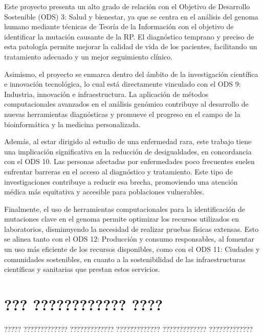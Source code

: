 \documentclass[11pt,spanish,listoffigures,listoftables]{tfgetsinf}
\begin{document}
Este proyecto presenta un alto grado de relación con el Objetivo de Desarrollo Sostenible (ODS) 3: Salud y bienestar, ya que se centra en el análisis del genoma humano mediante técnicas de Teoría de la Información con el objetivo de identificar la mutación causante de la RP. El diagnóstico temprano y preciso de esta patología permite mejorar la calidad de vida de los pacientes, facilitando un tratamiento adecuado y un mejor seguimiento clínico.

Asimismo, el proyecto se enmarca dentro del ámbito de la investigación científica e innovación tecnológica, lo cual está directamente vinculado con el ODS 9: Industria, innovación e infraestructura. La aplicación de métodos computacionales avanzados en el análisis genómico contribuye al desarrollo de nuevas herramientas diagnósticas y promueve el progreso en el campo de la bioinformática y la medicina personalizada.

Además, al estar dirigido al estudio de una enfermedad rara, este trabajo tiene una implicación significativa en la reducción de desigualdades, en concordancia con el ODS 10. Las personas afectadas por enfermedades poco frecuentes suelen enfrentar barreras en el acceso al diagnóstico y tratamiento. Este tipo de investigaciones contribuye a reducir esa brecha, promoviendo una atención médica más equitativa y accesible para poblaciones vulnerables.

Finalmente, el uso de herramientas computacionales para la identificación de mutaciones clave en el genoma permite optimizar los recursos utilizados en laboratorios, disminuyendo la necesidad de realizar pruebas físicas extensas. Esto se alinea tanto con el ODS 12: Producción y consumo responsables, al fomentar un uso más eficiente de los recursos disponibles, como con el ODS 11: Ciudades y comunidades sostenibles, en cuanto a la sostenibilidad de las infraestructuras científicas y sanitarias que prestan estos servicios.





\chapter{??? ???????????? ????}

????? ????????????? ????????????? ????????????? ????????????? ????????????? 



\end{document}
